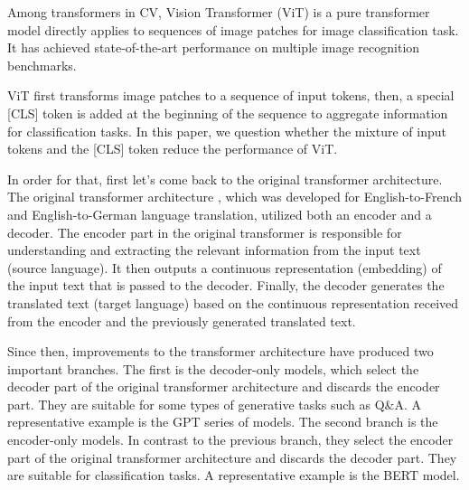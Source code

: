 \documentclass[anon,12pt]{colt2024} %
\begin{document}
Among transformers in CV, Vision Transformer (ViT) is a pure transformer model directly applies to sequences of image patches for image classification task.
It has achieved state-of-the-art performance on multiple image recognition benchmarks.

ViT first transforms image patches to a sequence of input tokens, then, a special [CLS] token is added at the beginning of the sequence to aggregate information for classification tasks.
In this paper, we question whether the mixture of input tokens and the [CLS] token reduce the performance of ViT.


In order for that, first let's come back to the original transformer architecture. 
The original transformer architecture \cite{vaswani2017attention}, which was developed for English-to-French and English-to-German language translation, utilized both an encoder and a decoder.
The encoder part in the original transformer is responsible for understanding and extracting the relevant information from the input text (source language). It then outputs a continuous representation (embedding) of the input text that is passed to the decoder. Finally, the decoder generates the translated text (target language) based on the continuous representation received from the encoder and the previously generated translated text. 

Since then, improvements to the transformer architecture have produced two important branches. 
The first is the decoder-only models, which select the decoder part of the original transformer architecture and discards the encoder part. 
They are suitable for some types of generative tasks such as Q\&A.
A representative example is the GPT \cite{radford2018improving, brown2020language,ouyang2022training} series of models.
The second branch is the encoder-only models. In contrast to the previous branch, they select the encoder part of the original transformer architecture and discards the decoder part.
They are suitable for classification tasks. A representative example is the BERT \cite{devlin2018bert} model. 
\end{document}
